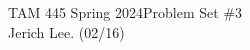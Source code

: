 \documentclass[12pt]{article}
\begin{document}
\noindent TAM 445 Spring 2024\hfill Problem Set \#3\\
Jerich Lee. (02/16)

\hrulefill







\end{document}
